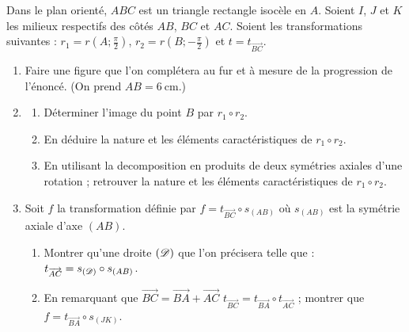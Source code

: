 \begin{exo} %
      Dans le plan orient\'e, $ABC$ est un triangle rectangle isoc\`ele en $A$.
      Soient $I$, $J$ et $K$ les milieux respectifs des c\^ot\'es $AB$, $BC$ et $AC$.
      Soient les transformations suivantes :
      $r_1 = r(A ; \frac{\pi}{2})$, $r_2 = r(B ; -\frac{\pi}{2})$ et $t = t_{\overrightarrow{BC}}$.
      \begin{enumerate}
            \item Faire une figure que l'on compl\'etera au fur et \`a mesure de la progression de l'\'enonc\'e.
                  (On prend $AB = 6~\mathrm{cm}$.)
            \item \begin{enumerate}
                        \item D\'eterminer l'image du point $B$ par $r_1 \circ r_2$.
                        \item En d\'eduire la nature et les \'el\'ements caract\'eristiques de $r_1 \circ r_2$.
                        \item En utilisant la decomposition en produits de deux sym\'etries axiales d'une rotation ;
                              retrouver la nature et les \'el\'ements caract\'eristiques de $r_1 \circ r_2$.
                  \end{enumerate}
            \item Soit $f$ la transformation d\'efinie par $f = t_{\overrightarrow{BC}} \circ s_{(AB)}$
                  o\`u $s_{(AB)}$ est la sym\'etrie axiale d'axe $(AB)$.
                  \begin{enumerate}
                        \item Montrer qu'une droite $(\mathscr{D})$ que l'on pr\'ecisera telle que :
                              $t_{\overrightarrow{AC}} = s_{(\mathscr{D})} \circ s_{(AB)}$.
                        \item En remarquant que $\overrightarrow{BC} = \overrightarrow{BA} + \overrightarrow{AC}$
                              $t_{\overrightarrow{BC}} = t_{\overrightarrow{BA}}  \circ t_{\overrightarrow{AC}}$ ;
                              montrer que $f = t_{\overrightarrow{BA}} \circ s_{(JK)}$.
                  \end{enumerate}
      \end{enumerate}
\end{exo}
